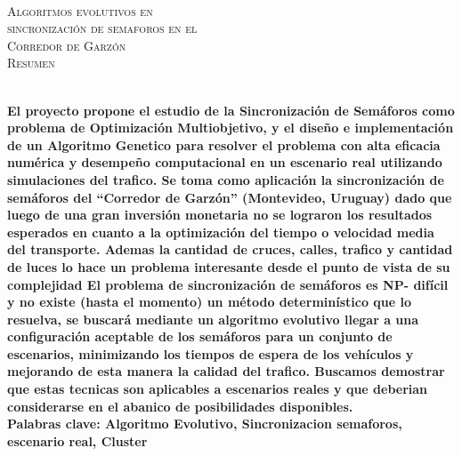 {
\thispagestyle{empty}
~\\[0.2cm]
\begin{center}
    \textsc{\huge Algoritmos evolutivos en  } \\[0.2cm] 
    \textsc{\huge sincronización de semaforos en el  } \\[0.2cm]         
    \textsc{\huge Corredor de Garzón} \\[1cm]
    \textsc{\Large Resumen}
\end{center}
~\\[0.2cm]
\textbf{\large 
El proyecto propone el estudio de la Sincronización de Semáforos como problema de Optimización Multiobjetivo, y el diseño e implementación de un Algoritmo Genetico para resolver el problema con alta eficacia numérica y desempeño computacional en un escenario real utilizando simulaciones del trafico. \newline \newline
Se toma como aplicación la sincronización de semáforos del “Corredor de Garzón” (Montevideo, Uruguay) dado que luego de una gran inversión monetaria no se lograron los resultados esperados en cuanto a la optimización del tiempo o velocidad media del transporte. Ademas la cantidad de cruces, calles, trafico y cantidad de luces lo hace un problema interesante desde el punto de vista de su complejidad \newline \newline
El problema de sincronización de semáforos es NP- difícil y no existe (hasta el momento) un método determinístico que lo resuelva, se buscará mediante un algoritmo evolutivo llegar a una configuración aceptable de los semáforos para un conjunto de escenarios, minimizando los tiempos de espera de los vehículos y mejorando de esta manera la calidad del trafico.
Buscamos demostrar que estas tecnicas son aplicables a escenarios reales y que deberian considerarse en el abanico de posibilidades disponibles. } 	
	~\\[1.0cm]
    \textbf{\large Palabras clave: Algoritmo Evolutivo, Sincronizacion semaforos, escenario real, Cluster}

}
\cleardoublepage
